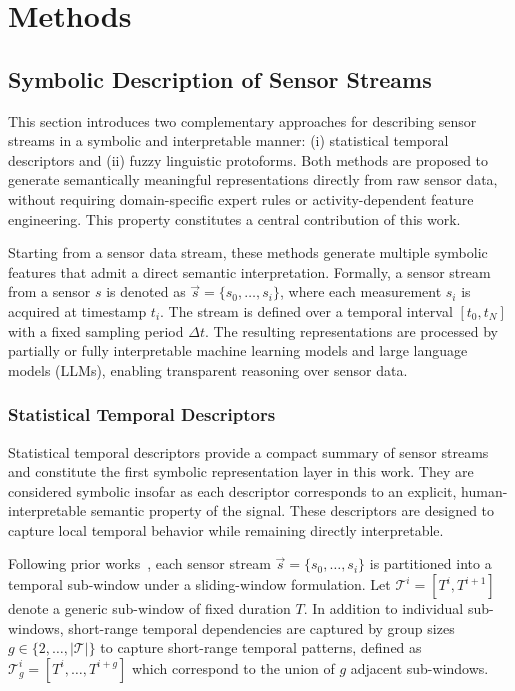 \documentclass[preprint,12pt]{elsarticle}
\begin{document}
\section{Methods}
\label{sec:methodology}

\subsection{Symbolic Description of Sensor Streams}
\label{Symbolic Description of Sensor Streams}
This section introduces two complementary approaches for describing sensor streams in a symbolic and interpretable manner: (i) statistical temporal descriptors and (ii) fuzzy linguistic protoforms. Both methods are proposed to generate semantically meaningful representations directly from raw sensor data, without requiring domain-specific expert rules or activity-dependent feature engineering. This property constitutes a central contribution of this work.

Starting from a sensor data stream, these methods generate multiple symbolic features that admit a direct semantic interpretation. Formally, a sensor stream from a sensor $s$ is denoted as $\vec{s} = \{s_0, \ldots, s_i\}$, where each measurement $s_i$ is acquired at timestamp $t_i$. The stream is defined over a temporal interval $[t_0, t_N]$ with a fixed sampling period $\Delta t$. The resulting representations are processed by partially or fully interpretable machine learning models and large language models (LLMs), enabling transparent reasoning over sensor data.


\subsubsection{Statistical Temporal Descriptors}

Statistical temporal descriptors provide a compact summary of sensor streams and constitute the first symbolic representation layer in this work. They are considered symbolic insofar as each descriptor corresponds to an explicit, human-interpretable semantic property of the signal. These descriptors are designed to capture local temporal behavior while remaining directly interpretable.

Following prior works~\cite{li2025sensorllm, banos2014window}, each sensor stream $\vec{s}=\{s_0,\ldots,s_i\}$ is partitioned into a temporal sub-window under a sliding-window formulation. Let $\mathcal{T}^i = [T^{i},T^{i+1}]$ denote a generic sub-window of fixed duration $T$. In addition to individual sub-windows, short-range temporal dependencies are captured by group sizes $g \in \{2,\ldots,|\mathcal{T}|\}$ to capture short-range temporal patterns, defined as $\mathcal{T}^i_g = [T^{i}, \ldots, T^{i+g}]$ which correspond to the union of $g$ adjacent sub-windows.
\end{document}
